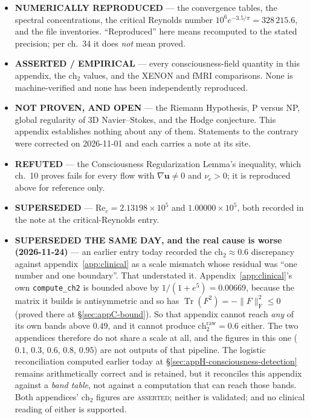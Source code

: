 \begin{itemize}
\item \textbf{NUMERICALLY REPRODUCED} --- the convergence tables, the spectral
  concentrations, the critical Reynolds number
  $10^6 e^{-3.5/\pi} = 328\,215.6$, and the file inventories. ``Reproduced''
  here means recomputed to the stated precision; per ch.~34 it does
  \emph{not} mean proved.
\item \textbf{ASSERTED / EMPIRICAL} --- every consciousness-field quantity in
  this appendix, the $\text{ch}_2$ values, and the XENON and fMRI comparisons.
  None is machine-verified and none has been independently reproduced.
\item \textbf{NOT PROVEN, AND OPEN} --- the Riemann Hypothesis, P versus NP,
  global regularity of 3D Navier--Stokes, and the Hodge conjecture. This
  appendix establishes nothing about any of them. Statements to the contrary
  were corrected on 2026-11-01 and each carries a note at its site.
\item \textbf{REFUTED} --- the Consciousness Regularization Lemma's inequality,
  which ch.~10 proves fails for every flow with $\nabla\mathbf{u} \neq 0$ and
  $\nu_c > 0$; it is reproduced above for reference only.
\item \textbf{SUPERSEDED} --- $\text{Re}_c = 2.13198\times10^5$ and
  $1.00000\times10^5$, both recorded in the note at the critical-Reynolds entry.
\item \textbf{SUPERSEDED THE SAME DAY, and the real cause is worse
  (2026-11-24)} --- an earlier entry today recorded the $\text{ch}_2 \approx
  0.6$ discrepancy against appendix~\ref{app:clinical} as a scale mismatch
  whose residual was ``one number and one boundary''. That understated it.
  Appendix~\ref{app:clinical}'s own \texttt{compute\_ch2} is bounded above by
  $1/(1+e^{5}) = 0.00669$, because the matrix it builds is antisymmetric and
  so has $\operatorname{Tr}(F^2) = -\lVert F\rVert^2_{\mathrm{F}} \leq 0$
  (proved there at \S\ref{sec:appC-bound}). So that appendix cannot reach
  \emph{any} of its own bands above $0.49$, and it cannot produce
  $\text{ch}_2^{\text{raw}} = 0.6$ either. The two appendices therefore do not
  share a scale at all, and the figures in this one
  ($0.1$, $0.3$, $0.6$, $0.8$, $0.95$) are not outputs of that pipeline. The
  logistic reconciliation computed earlier today at
  \S\ref{sec:appH-consciousness-detection} remains arithmetically correct and
  is retained, but it reconciles this appendix against a \emph{band table},
  not against a computation that can reach those bands. Both appendices'
  $\text{ch}_2$ figures are \textsc{asserted}; neither is validated; and no
  clinical reading of either is supported.
\end{itemize}
